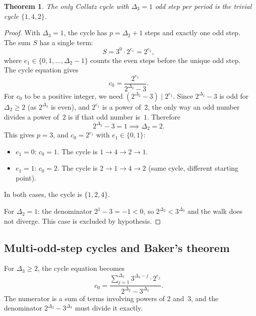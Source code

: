 \documentclass[11pt,a4paper]{article}
\theoremstyle{plain}
\newtheorem{theorem}{Theorem}[section]
\theoremstyle{definition}
\begin{document}
\begin{theorem}\label{thm:one-odd}
The only Collatz cycle with $\Delta_3 = 1$ odd step per period is
the trivial cycle $\{1, 4, 2\}$.
\end{theorem}

\begin{proof}
With $\Delta_3 = 1$, the cycle has $p = \Delta_2 + 1$ steps and
exactly one odd step.  The sum $S$ has a single term:
\[
  S = 3^0 \cdot 2^{e_1} = 2^{e_1},
\]
where $e_1 \in \{0, 1, \ldots, \Delta_2 - 1\}$ counts the even
steps before the unique odd step.  The cycle equation gives
\[
  c_0 = \frac{2^{e_1}}{2^{\Delta_2} - 3}.
\]
For $c_0$ to be a positive integer, we need
$(2^{\Delta_2} - 3) \mid 2^{e_1}$.  Since $2^{\Delta_2} - 3$ is
odd for $\Delta_2 \ge 2$ (as $2^{\Delta_2}$ is even), and $2^{e_1}$
is a power of~$2$, the only way an odd number divides a power of~$2$
is if that odd number is~$1$.  Therefore
\[
  2^{\Delta_2} - 3 = 1 \implies \Delta_2 = 2.
\]
This gives $p = 3$, and $c_0 = 2^{e_1}$ with $e_1 \in \{0, 1\}$:
\begin{itemize}
  \item $e_1 = 0$: $c_0 = 1$.  The cycle is $1 \to 4 \to 2 \to 1$.
  \item $e_1 = 1$: $c_0 = 2$.  The cycle is $2 \to 1 \to 4 \to 2$
    (same cycle, different starting point).
\end{itemize}
In both cases, the cycle is $\{1, 2, 4\}$.

\medskip\noindent
For $\Delta_2 = 1$: the denominator $2^1 - 3 = -1 < 0$, so
$2^{\Delta_2} < 3^{\Delta_3}$ and the walk does not diverge.
This case is excluded by hypothesis.
\end{proof}

\subsection{Multi-odd-step cycles and Baker's theorem}

For $\Delta_3 \ge 2$, the cycle equation becomes
\[
  c_0 = \frac{\sum_{j=1}^{\Delta_3} 3^{\Delta_3 - j} \cdot 2^{e_j}}
             {2^{\Delta_2} - 3^{\Delta_3}}.
\]
The numerator is a sum of terms involving powers of $2$ and~$3$,
and the denominator $2^{\Delta_2} - 3^{\Delta_3}$ must divide it exactly.
\end{document}
